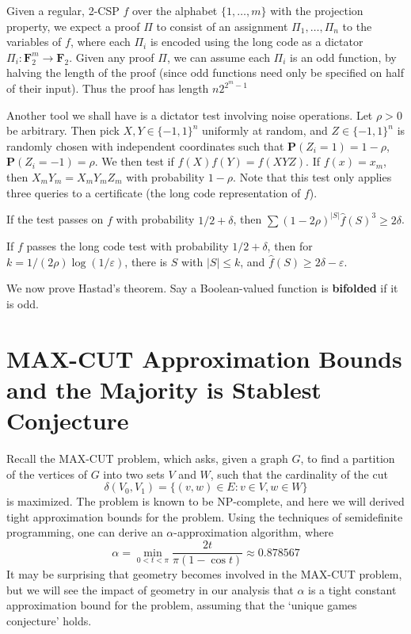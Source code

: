 Given a regular, 2-CSP $f$ over the alphabet $\{ 1, \dots, m \}$ with the projection property, we expect a proof $\Pi$ to consist of an assignment $\Pi_1, \dots, \Pi_n$ to the variables of $f$, where each $\Pi_i$ is encoded using the long code as a dictator $\Pi_i: \mathbf{F}_2^m \to \mathbf{F}_2$. Given any proof $\Pi$, we can assume each $\Pi_i$ is an odd function, by halving the length of the proof (since odd functions need only be specified on half of their input). Thus the proof has length $n2^{2^m-1}$

Another tool we shall have is a dictator test involving noise operations. Let $\rho > 0$ be arbitrary. Then pick $X,Y \in \{ -1, 1 \}^n$ uniformly at random, and $Z \in \{ -1, 1 \}^n$ is randomly chosen with independent coordinates such that $\mathbf{P}(Z_i = 1) = 1 - \rho$, $\mathbf{P}(Z_i = -1) = \rho$. We then test if $f(X)f(Y) = f(XYZ)$. If $f(x) = x_m$, then $X_mY_m = X_mY_mZ_m$ with probability $1 - \rho$. Note that this test only applies three queries to a certificate (the long code representation of $f$).

\begin{theorem}
    If the test passes on $f$ with probability $1/2 + \delta$, then $\sum (1 - 2 \rho)^{|S|} \widehat{f}(S)^3 \geq 2 \delta$.
\end{theorem}

\begin{corollary}
    If $f$ passes the long code test with probability $1/2 + \delta$, then for $k = 1/(2\rho) \log(1/\varepsilon)$, there is $S$ with $|S| \leq k$, and $\widehat{f}(S) \geq 2 \delta - \varepsilon$.
\end{corollary}

We now prove Hastad's theorem. Say a Boolean-valued function is {\bf bifolded} if it is odd.








\section{MAX-CUT Approximation Bounds and the Majority is Stablest Conjecture}

Recall the MAX-CUT problem, which asks, given a graph $G$, to find a partition of the vertices of $G$ into two sets $V$ and $W$, such that the cardinality of the cut
%
\[ \delta(V_0,V_1) = \{ (v,w) \in E : v \in V, w \in W \} \]
%
is maximized. The problem is known to be NP-complete, and here we will derived tight approximation bounds for the problem. Using the techniques of semidefinite programming, one can derive an $\alpha$-approximation algorithm, where
%
\[ \alpha = \min_{0 < t < \pi} \frac{2t}{\pi (1 - \cos t)} \approx 0.878567 \]
%
It may be surprising that geometry becomes involved in the MAX-CUT problem, but we will see the impact of geometry in our analysis that $\alpha$ is a tight constant approximation bound for the problem, assuming that the `unique games conjecture' holds.

